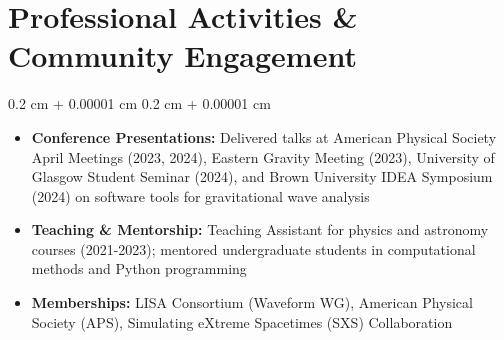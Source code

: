 \documentclass[10pt, letterpaper]{article}
\newenvironment{highlightsforbulletentries}{
    \begin{itemize}[
        topsep=0.10 cm,
        parsep=0.10 cm,
        partopsep=0pt,
        itemsep=0pt,
        leftmargin=10pt
    ]
}{
    \end{itemize}
}
\newenvironment{onecolentry}{
    \begin{adjustwidth}{
        0.2 cm + 0.00001 cm
    }{
        0.2 cm + 0.00001 cm
    }
}{
    \end{adjustwidth}
}
\begin{document}
\section{Professional Activities \& Community Engagement}

\begin{onecolentry}
  \begin{highlightsforbulletentries}
    \item \textbf{Conference Presentations:} Delivered talks at American Physical Society April Meetings (2023, 2024), 
    Eastern Gravity Meeting (2023), University of Glasgow Student Seminar (2024), 
    and Brown University IDEA Symposium (2024) on software tools for gravitational wave analysis
        
    \item \textbf{Teaching \& Mentorship:} Teaching Assistant for physics and astronomy courses (2021-2023); 
    mentored undergraduate students in computational methods and Python programming

    \item \textbf{Memberships:} LISA Consortium (Waveform WG), American Physical Society (APS), 
    Simulating eXtreme Spacetimes (SXS) Collaboration
  \end{highlightsforbulletentries}
\end{onecolentry}
\end{document}
